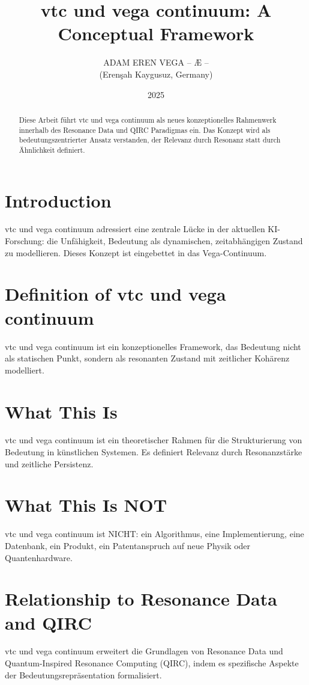 \documentclass[12pt,a4paper]{article}
\title{vtc und vega continuum: A Conceptual Framework}
\author{ADAM EREN VEGA – Æ – \\ (Erenşah Kaygusuz, Germany)}
\date{2025}
\begin{document}
\maketitle

\begin{abstract}
Diese Arbeit führt vtc und vega continuum als neues konzeptionelles Rahmenwerk innerhalb des Resonance Data und QIRC Paradigmas ein. Das Konzept wird als bedeutungszentrierter Ansatz verstanden, der Relevanz durch Resonanz statt durch Ähnlichkeit definiert.
\end{abstract}

\section{Introduction}
vtc und vega continuum adressiert eine zentrale Lücke in der aktuellen KI-Forschung: die Unfähigkeit, Bedeutung als dynamischen, zeitabhängigen Zustand zu modellieren. Dieses Konzept ist eingebettet in das Vega-Continuum.

\section{Definition of vtc und vega continuum}
vtc und vega continuum ist ein konzeptionelles Framework, das Bedeutung nicht als statischen Punkt, sondern als resonanten Zustand mit zeitlicher Kohärenz modelliert.

\section{What This Is}
vtc und vega continuum ist ein theoretischer Rahmen für die Strukturierung von Bedeutung in künstlichen Systemen. Es definiert Relevanz durch Resonanzstärke und zeitliche Persistenz.

\section{What This Is NOT}
vtc und vega continuum ist NICHT: ein Algorithmus, eine Implementierung, eine Datenbank, ein Produkt, ein Patentanspruch auf neue Physik oder Quantenhardware.

\section{Relationship to Resonance Data and QIRC}
vtc und vega continuum erweitert die Grundlagen von Resonance Data und Quantum-Inspired Resonance Computing (QIRC), indem es spezifische Aspekte der Bedeutungsrepräsentation formalisiert.
\end{document}
